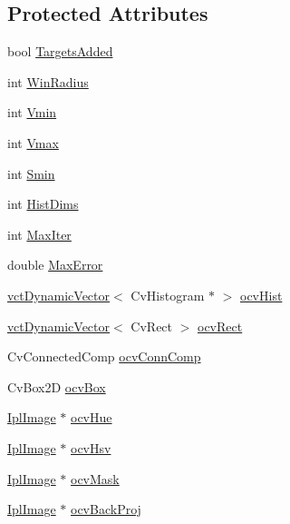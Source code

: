 \subsection*{Protected Attributes}
\begin{DoxyCompactItemize}
\item 
bool \hyperlink{classsvl_tracker_o_c_v_mean_shift_a2054ed2ac9e61dc68e1c8d5733452e38}{Targets\-Added}
\item 
int \hyperlink{classsvl_tracker_o_c_v_mean_shift_a33e7390d7ed52a9a2f784ac7bf6a7c56}{Win\-Radius}
\item 
int \hyperlink{classsvl_tracker_o_c_v_mean_shift_a819979074decd36baa5f75e0db95764b}{Vmin}
\item 
int \hyperlink{classsvl_tracker_o_c_v_mean_shift_aa30ea527e09f1642723f72b8052c4128}{Vmax}
\item 
int \hyperlink{classsvl_tracker_o_c_v_mean_shift_ac9580a13deb4e3ccaa171070a09b6b95}{Smin}
\item 
int \hyperlink{classsvl_tracker_o_c_v_mean_shift_a9a31cf37921c221d9aa82f0d5aeaaece}{Hist\-Dims}
\item 
int \hyperlink{classsvl_tracker_o_c_v_mean_shift_a72ce057b765f9a1f38d79651659b12fd}{Max\-Iter}
\item 
double \hyperlink{classsvl_tracker_o_c_v_mean_shift_a088ba363e76d5e1129a3db18f17d8a1e}{Max\-Error}
\item 
\hyperlink{classvct_dynamic_vector}{vct\-Dynamic\-Vector}$<$ Cv\-Histogram $\ast$ $>$ \hyperlink{classsvl_tracker_o_c_v_mean_shift_a91f614062a5d81f7baa035168705ee56}{ocv\-Hist}
\item 
\hyperlink{classvct_dynamic_vector}{vct\-Dynamic\-Vector}$<$ Cv\-Rect $>$ \hyperlink{classsvl_tracker_o_c_v_mean_shift_aef4078c2bb25bf33cbf01d1f1525545f}{ocv\-Rect}
\item 
Cv\-Connected\-Comp \hyperlink{classsvl_tracker_o_c_v_mean_shift_afbd5ec234b24bf1b561ebf0c66761d79}{ocv\-Conn\-Comp}
\item 
Cv\-Box2\-D \hyperlink{classsvl_tracker_o_c_v_mean_shift_af704a1f15a4ff13d0c1b052b74589ffe}{ocv\-Box}
\item 
\hyperlink{svl_types_8h_aa5a40a13021ba9708bfe921e18fdfa53}{Ipl\-Image} $\ast$ \hyperlink{classsvl_tracker_o_c_v_mean_shift_a84665b7a5ea0d434fda0555c01456bb7}{ocv\-Hue}
\item 
\hyperlink{svl_types_8h_aa5a40a13021ba9708bfe921e18fdfa53}{Ipl\-Image} $\ast$ \hyperlink{classsvl_tracker_o_c_v_mean_shift_aea791761a2b3163716626b33ac3965cd}{ocv\-Hsv}
\item 
\hyperlink{svl_types_8h_aa5a40a13021ba9708bfe921e18fdfa53}{Ipl\-Image} $\ast$ \hyperlink{classsvl_tracker_o_c_v_mean_shift_ad5f62155accaa1529eca7ee87bf2df54}{ocv\-Mask}
\item 
\hyperlink{svl_types_8h_aa5a40a13021ba9708bfe921e18fdfa53}{Ipl\-Image} $\ast$ \hyperlink{classsvl_tracker_o_c_v_mean_shift_a4d006bede9016ce5596552d3c3b118b9}{ocv\-Back\-Proj}
\end{DoxyCompactItemize}


